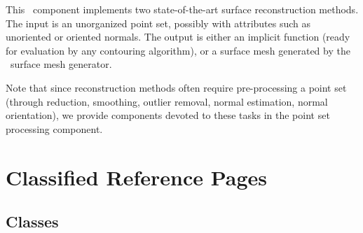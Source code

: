 


This \cgal\ component implements two state-of-the-art surface reconstruction methods. The input is an unorganized point set, possibly with attributes such as unoriented or oriented normals. The output is either an implicit function (ready for evaluation by any contouring algorithm), or a surface mesh generated by the \cgal\ surface mesh generator.

Note that since reconstruction methods often require pre-processing a point set (through reduction, smoothing, outlier removal, normal estimation, normal orientation), we provide components devoted to these tasks in the point set processing component.

\section{Classified Reference Pages}

\subsection{Classes}

  \\
  \\

